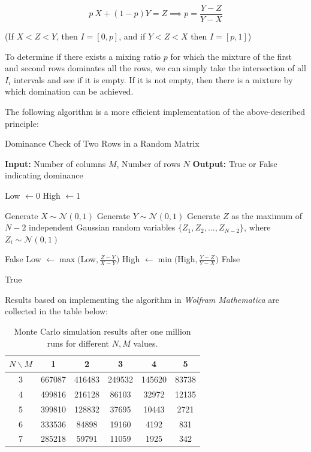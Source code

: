\documentclass{article}
\theoremstyle{definition}
\begin{document}
\begin{appendices}
\begin{equation}
    p \ X + (1-p) Y = Z \implies p = \frac{Y-Z}{Y-X}
\end{equation}

(If $X<Z<Y$, then $I=[0,p]$, and if $Y<Z<X$ then $I=[p,1]$)

To determine if there exists a mixing ratio $p$ for which the mixture of the first and second rows dominates all the rows, we can simply take the intersection of all $I_i$ intervals and see if it is empty. If it is not empty, then there is a mixture by which domination can be achieved.

The following algorithm is a more efficient implementation of the above-described principle:

\begin{algorithm}[H]
\caption{Dominance Check of Two Rows in a Random Matrix}
\begin{algorithmic}[1]
\State \textbf{Input:} Number of columns $M$, Number of rows $N$
\State \textbf{Output:} True or False indicating dominance

\State Low $\gets 0$
\State High $\gets 1$

    \State Generate $X \sim \mathcal{N}(0, 1)$
    \State Generate $Y \sim \mathcal{N}(0, 1)$
    \State Generate $Z$ as the maximum of $N-2$ independent Gaussian random variables $\{Z_1, Z_2, \ldots, Z_{N-2}\}$, where $Z_i \sim \mathcal{N}(0, 1)$
    
        \State \Return False
    \Else
                \State Low $\gets \max($Low$, \frac{Z - Y}{X - Y})$
                \State High $\gets \min($High$, \frac{Y - Z}{Y - X})$
            \EndIf
                \State \Return False
            \EndIf
        \EndIf
    \EndIf
\EndFor

\State \Return True
\end{algorithmic}
\end{algorithm}

Results based on implementing the algorithm in {\it Wolfram Mathematica} are collected in the table below:

\begin{table}[H]
\centering
\begin{tabular}{|c|c|c|c|c|c|}
\hline
$N \backslash M$ & 1 & 2 & 3 & 4 & 5 \\ \hline
3 & 667087 & 416483 & 249532 & 145620 & 83738 \\ \hline
4 & 499816 & 216128 & 86103 & 32972 & 12135 \\ \hline
5 & 399810 & 128832 & 37695 & 10443 & 2721 \\ \hline
6 & 333536 & 84898 & 19160 & 4192 & 831 \\ \hline
7 & 285218 & 59791 & 11059 & 1925 & 342 \\ \hline
\end{tabular}
\caption{Monte Carlo simulation results after one million runs for different $N, M$ values.}
\end{table}


\end{appendices}
\end{document}
